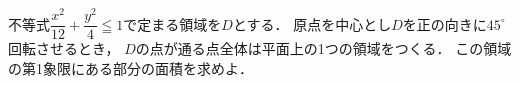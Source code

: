 \documentclass[../../main.tex]{subfiles}
\begin{document}
不等式$\displaystyle\dfrac{x^2}{12}+\dfrac{y^2}{4}\leqq1$で定まる領域を$D$とする．
原点を中心とし$D$を正の向きに${45}^\circ$回転させるとき，
$D$の点が通る点全体は平面上の1つの領域をつくる．
この領域の第1象限にある部分の面積を求めよ．
\end{document}
